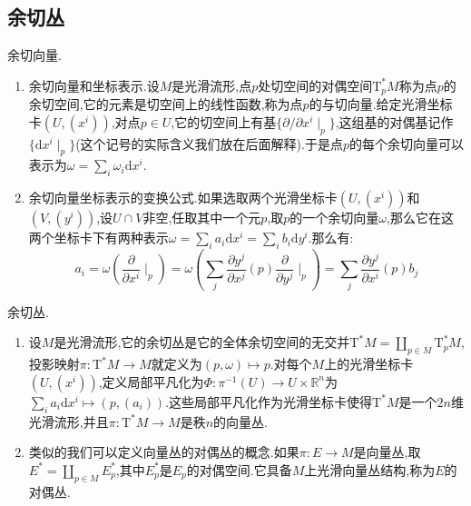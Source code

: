 \subsection{余切丛}

余切向量.
\begin{enumerate}
	\item 余切向量和坐标表示.设$M$是光滑流形,点$p$处切空间的对偶空间$\mathrm{T}^*_pM$称为点$p$的余切空间,它的元素是切空间上的线性函数,称为点$p$的与切向量.给定光滑坐标卡$(U,(x^i))$,对点$p\in U$,它的切空间上有基$\{\partial/\partial x^i\mid_p\}$,这组基的对偶基记作$\{\mathrm{d}x^i\mid_p\}$(这个记号的实际含义我们放在后面解释).于是点$p$的每个余切向量可以表示为$\omega=\sum_i\omega_i\mathrm{d}x^i$.
	\item 余切向量坐标表示的变换公式.如果选取两个光滑坐标卡$(U,(x^i))$和$(V,(y^i))$,设$U\cap V$非空,任取其中一个元$p$,取$p$的一个余切向量$\omega$,那么它在这两个坐标卡下有两种表示$\omega=\sum_ia_i\mathrm{d}x^i=\sum_ib_i\mathrm{d}y^i$.那么有:
	$$a_i=\omega\left(\frac{\partial}{\partial x^i}\mid_p\right)=\omega\left(\sum_j\frac{\partial y^j}{\partial x^j}(p)\frac{\partial}{\partial y^j}\mid_p\right)=\sum_j\frac{\partial y^j}{\partial x^i}(p)b_j$$
\end{enumerate}

余切丛.
\begin{enumerate}
	\item 设$M$是光滑流形,它的余切丛是它的全体余切空间的无交并$\mathrm{T}^*M=\coprod_{p\in M}\mathrm{T}^*_pM$,投影映射$\pi:\mathrm{T}^*M\to M$就定义为$(p,\omega)\mapsto p$.对每个$M$上的光滑坐标卡$(U,(x^i))$,定义局部平凡化为$\Phi:\pi^{-1}(U)\to U\times\mathbb{R}^n$为$\sum_ia_i\mathrm{d}x^i\mapsto(p,(a_i))$.这些局部平凡化作为光滑坐标卡使得$\mathrm{T}^*M$是一个$2n$维光滑流形,并且$\pi:\mathrm{T}^*M\to M$是秩$n$的向量丛.
	\item 类似的我们可以定义向量丛的对偶丛的概念.如果$\pi:E\to M$是向量丛,取$E^*=\coprod_{p\in M}E_p^*$,其中$E_p^*$是$E_p$的对偶空间.它具备$M$上光滑向量丛结构,称为$E$的对偶丛.
\end{enumerate}

